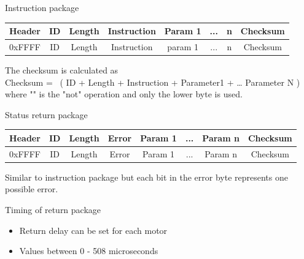 \documentclass{beamer}
\begin{document}


\begin{frame}{Instruction package}

    \begin{table}
        \begin{flushleft}
            \begin{tabular}{| c | c | c | c | c | c | c | c |}
                \hline
                Header & ID & Length & Instruction & Param 1 & ... & n & Checksum\\
                \hline
                0xFFFF & ID & Length & Instruction & param 1 & ... & n & Checksum\\
                \hline
            \end{tabular}
        \end{flushleft}
    \end{table}

    The checksum is calculated as\\
    Checksum = ~( ID + Length + Instruction + Parameter1 + … Parameter N )\\
    where "" is the "not" operation and only the lower byte is used.
\end{frame}



\begin{frame}{Status return package}

    \begin{table}
        \begin{flushleft}
            \begin{tabular}{| c | c | c | c | c | c | c | c |}
                \hline
                Header & ID & Length & Error & Param 1 & ... & Param n & Checksum\\
                \hline
                0xFFFF & ID & Length & Error & Param 1 & ... & Param n & Checksum\\
                \hline
            \end{tabular}
        \end{flushleft}
    \end{table}
    Similar to instruction package but each bit in the error byte represents one possible error.
    
\end{frame}



\begin{frame}{Timing of return package}

    \begin{itemize}
        \item Return delay can be set for each motor
        \item Values between 0 - 508 microseconds
    \end{itemize}
    
\end{frame}
\end{document}
